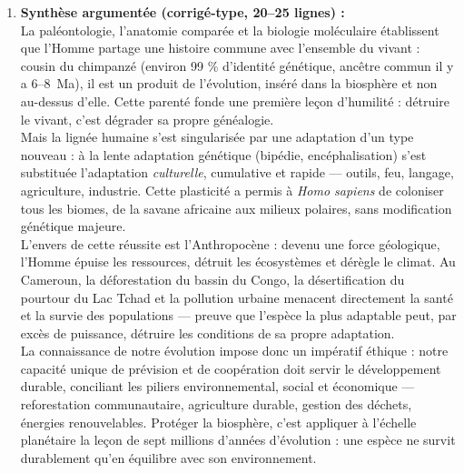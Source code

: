 \documentclass[11pt]{article}
\newcommand{\cle}[1]{{\popxbold\color{popdark}#1}}
\begin{document}
\begin{corrige}
\begin{enumerate}
\begin{itemize}
        \item On peut aussi citer l'installation humaine autour des \textbf{lacs Nyos et Monoun} (risque limnique : l'éruption de 1986 au lac Nyos a tué $\approx$ \num{1700} personnes) — le dégazage artificiel actuel illustre au contraire une adaptation technique responsable.
    \end{itemize}
    \item \textbf{Synthèse argumentée (corrigé-type, 20--25 lignes) :}\\
    La paléontologie, l'anatomie comparée et la biologie moléculaire établissent que l'Homme partage une histoire commune avec l'ensemble du vivant : cousin du chimpanzé (environ 99 \% d'identité génétique, ancêtre commun il y a 6--\SI{8}{Ma}), il est un produit de l'évolution, inséré dans la biosphère et non au-dessus d'elle. Cette parenté fonde une première leçon d'humilité : détruire le vivant, c'est dégrader sa propre généalogie.\\
    Mais la lignée humaine s'est singularisée par une adaptation d'un type nouveau : à la lente adaptation génétique (bipédie, encéphalisation) s'est substituée l'adaptation \emph{culturelle}, cumulative et rapide — outils, feu, langage, agriculture, industrie. Cette plasticité a permis à \emph{Homo sapiens} de coloniser tous les biomes, de la savane africaine aux milieux polaires, sans modification génétique majeure.\\
    L'envers de cette réussite est l'Anthropocène : devenu une force géologique, l'Homme épuise les ressources, détruit les écosystèmes et dérègle le climat. Au Cameroun, la déforestation du bassin du Congo, la désertification du pourtour du Lac Tchad et la pollution urbaine menacent directement la santé et la survie des populations — preuve que l'espèce la plus adaptable peut, par excès de puissance, détruire les conditions de sa propre adaptation.\\
    La connaissance de notre évolution impose donc un impératif éthique : notre capacité unique de prévision et de coopération doit servir le \cle{développement durable}, conciliant les piliers environnemental, social et économique — reforestation communautaire, agriculture durable, gestion des déchets, énergies renouvelables. Protéger la biosphère, c'est appliquer à l'échelle planétaire la leçon de sept millions d'années d'évolution : une espèce ne survit durablement qu'en équilibre avec son environnement.
\end{enumerate}
\end{corrige}
\end{document}
